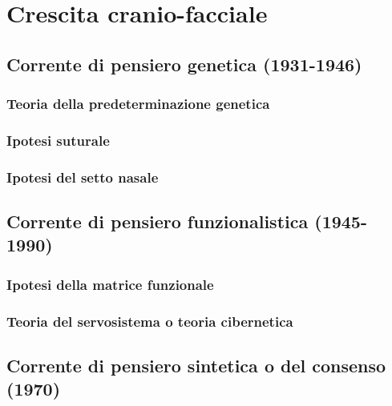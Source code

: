 \chapter{Crescita cranio-facciale}
\section{Corrente di pensiero genetica (1931-1946)}
\subsection{Teoria della predeterminazione genetica}
\subsection{Ipotesi suturale}
\subsection{Ipotesi del setto nasale}

\section{Corrente di pensiero funzionalistica (1945-1990)}
\subsection{Ipotesi della matrice funzionale}
\subsection{Teoria del servosistema o teoria cibernetica}

\section{Corrente di pensiero sintetica o del consenso (1970)}